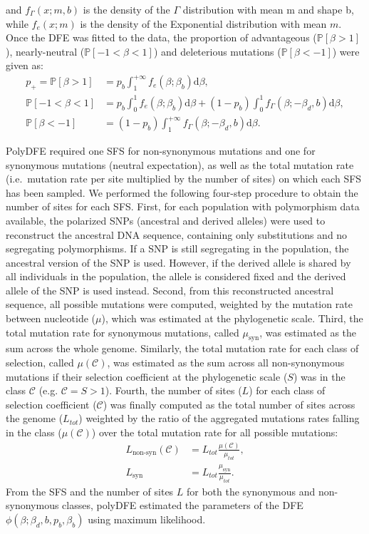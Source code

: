 \documentclass{article}
\newcommand{\der}{\textrm{d}}
\newcommand{\proba}{\mathbb{P}}
\newcommand{\Sphy}{S}
\newcommand{\Sphyclass}{\mathcal{C}}
\newcommand{\divAdv}{ \Sphy > 1}
\newcommand{\Spop}{\beta}
\newcommand{\polyDel}{\Spop < -1}
\newcommand{\polyNeutral}{-1 < \Spop < 1}
\newcommand{\polyAdv}{ \Spop > 1}
\newcommand{\PpolyDel}{\proba \left[ \polyDel \right]}
\newcommand{\PpolyNeutral}{\proba \left[ \polyNeutral \right]}
\newcommand{\PpolyAdv}{\proba \left[ \polyAdv \right]}
\begin{document}
    and $f_{\Gamma}(x; m, b)$ is the density of the $\Gamma$ distribution with mean m and shape b, while $f_{e}(x; m)$ is the density of the Exponential distribution with mean $m$.
    Once the DFE was fitted to the data, the proportion of advantageous ($\PpolyAdv$), nearly-neutral ($\PpolyNeutral$) and deleterious mutations ($\PpolyDel$) were given as:
    \begin{align}
        p_+ = \PpolyAdv &= p_b \int_{1}^{+\infty} f_{e}(\Spop; \Spop_b) \der \Spop,  \\
        \PpolyNeutral &= p_b \int_{0}^{1} f_{e}(\Spop; \Spop_b) \der \Spop + \left( 1 - p_b \right) \int_{0}^{1} f_{\Gamma}(\Spop; -\Spop_d, b) \der \Spop, \\
        \PpolyDel &= \left( 1 - p_b \right) \int_{1}^{+\infty} f_{\Gamma}(\Spop; -\Spop_d, b) \der \Spop.
    \end{align}

    PolyDFE required one SFS for non-synonymous mutations and one for synonymous mutations (neutral expectation), as well as the total mutation rate (i.e.~mutation rate per site multiplied by the number of sites) on which each SFS has been sampled.
    We performed the following four-step procedure to obtain the number of sites for each SFS.
    First, for each population with polymorphism data available, the polarized SNPs (ancestral and derived alleles) were used to reconstruct the ancestral DNA sequence, containing only substitutions and no segregating polymorphisms.
    If a SNP is still segregating in the population, the ancestral version of the SNP is used.
    However, if the derived allele is shared by all individuals in the population, the allele is considered fixed and the derived allele of the SNP is used instead.
    Second, from this reconstructed ancestral sequence, all possible mutations were computed, weighted by the mutation rate between nucleotide ($\mu$), which was estimated at the phylogenetic scale.
    Third, the total mutation rate for synonymous mutations, called $\mu_{\textrm{syn}}$, was estimated as the sum across the whole genome.
    Similarly, the total mutation rate for each class of selection, called  $\mu\left( \Sphyclass \right)$, was estimated as the sum across all non-synonymous mutations if their selection coefficient at the phylogenetic scale ($\Sphy$) was in the class $\Sphyclass$ (e.g. $\Sphyclass = \divAdv$).
    Fourth, the number of sites ($L$) for each class of selection coefficient ($\Sphyclass$) was finally computed as the total number of sites across the genome ($L_{tot}$) weighted by the ratio of the aggregated mutations rates falling in the class ($\mu\left( \Sphyclass \right)$) over the total mutation rate for all possible mutations:
    \begin{align}
        L_{\textrm{non-syn}} \left( \Sphyclass \right) &= L_{tot} \frac{\mu\left( \Sphyclass \right)}{\mu_{tot}}, \\
        L_{\textrm{syn}} &= L_{tot} \frac{\mu_{\textrm{syn}}}{\mu_{tot}}.
    \end{align}
    From the SFS and the number of sites $L$ for both the synonymous and non-synonymous classes, polyDFE estimated the parameters of the DFE $\phi \left( \Spop; \Spop_d , b, p_b, \Spop_b \right)$ using maximum likelihood.
\end{document}
